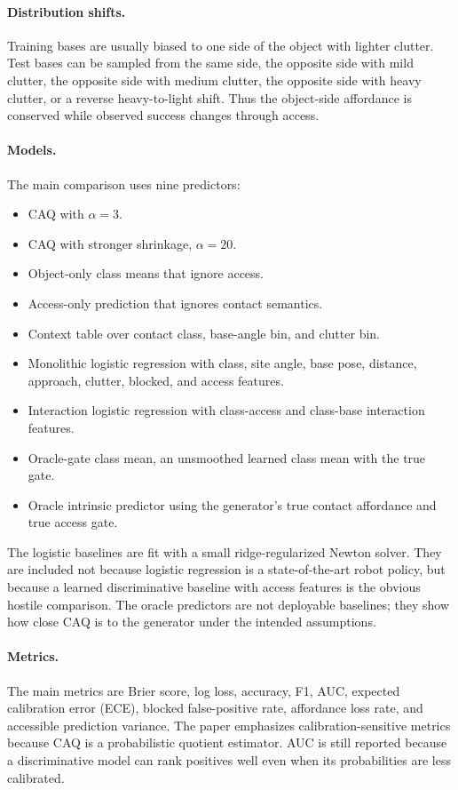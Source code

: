 \documentclass{article}
\begin{document}
\paragraph{Distribution shifts.}
Training bases are usually biased to one side of the object with lighter clutter. Test bases can be sampled from the same side, the opposite side with mild clutter, the opposite side with medium clutter, the opposite side with heavy clutter, or a reverse heavy-to-light shift. Thus the object-side affordance is conserved while observed success changes through access.

\paragraph{Models.}
The main comparison uses nine predictors:
\begin{itemize}
    \item CAQ with $\alpha=3$.
    \item CAQ with stronger shrinkage, $\alpha=20$.
    \item Object-only class means that ignore access.
    \item Access-only prediction that ignores contact semantics.
    \item Context table over contact class, base-angle bin, and clutter bin.
    \item Monolithic logistic regression with class, site angle, base pose, distance, approach, clutter, blocked, and access features.
    \item Interaction logistic regression with class-access and class-base interaction features.
    \item Oracle-gate class mean, an unsmoothed learned class mean with the true gate.
    \item Oracle intrinsic predictor using the generator's true contact affordance and true access gate.
\end{itemize}

The logistic baselines are fit with a small ridge-regularized Newton solver. They are included not because logistic regression is a state-of-the-art robot policy, but because a learned discriminative baseline with access features is the obvious hostile comparison. The oracle predictors are not deployable baselines; they show how close CAQ is to the generator under the intended assumptions.

\paragraph{Metrics.}
The main metrics are Brier score, log loss, accuracy, F1, AUC, expected calibration error (ECE), blocked false-positive rate, affordance loss rate, and accessible prediction variance. The paper emphasizes calibration-sensitive metrics because CAQ is a probabilistic quotient estimator. AUC is still reported because a discriminative model can rank positives well even when its probabilities are less calibrated.
\end{document}
